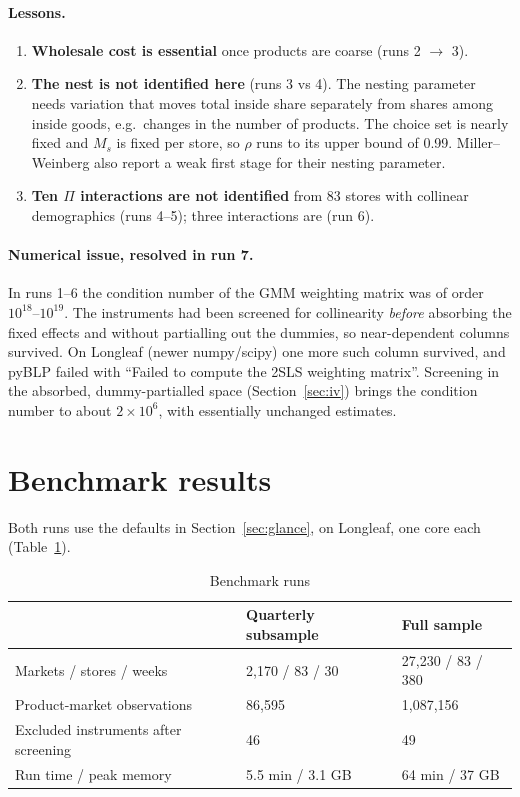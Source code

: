 \documentclass[11pt]{article}
\begin{document}
\paragraph{Lessons.}
\begin{enumerate}
  \item \textbf{Wholesale cost is essential} once products are coarse (runs 2 $\to$ 3).
  \item \textbf{The nest is not identified here} (runs 3 vs 4). The nesting parameter needs
        variation that moves total inside share separately from shares among inside goods,
        e.g.\ changes in the number of products. The choice set is nearly fixed and $M_s$ is
        fixed per store, so $\rho$ runs to its upper bound of 0.99. Miller--Weinberg also
        report a weak first stage for their nesting parameter.
  \item \textbf{Ten $\Pi$ interactions are not identified} from 83 stores with collinear
        demographics (runs 4--5); three interactions are (run 6).
\end{enumerate}

\paragraph{Numerical issue, resolved in run 7.} In runs 1--6 the condition number of the GMM
weighting matrix was of order $10^{18}$--$10^{19}$. The instruments had been screened for
collinearity \emph{before} absorbing the fixed effects and without partialling out the dummies,
so near-dependent columns survived. On Longleaf (newer numpy/scipy) one more such column
survived, and pyBLP failed with ``Failed to compute the 2SLS weighting matrix''. Screening in
the absorbed, dummy-partialled space (Section~\ref{sec:iv}) brings the condition number to
about $2\times10^6$, with essentially unchanged estimates.

\section{Benchmark results}\label{sec:results}

Both runs use the defaults in Section~\ref{sec:glance}, on Longleaf, one core each
(Table~\ref{tab:runs}).

\begin{table}[htbp]
\centering
\small
\caption{Benchmark runs}\label{tab:runs}
\begin{tabular}{@{}lll@{}}
\toprule
 & Quarterly subsample & Full sample \\
\midrule
Markets / stores / weeks & 2,170 / 83 / 30 & 27,230 / 83 / 380 \\
Product-market observations & 86,595 & 1,087,156 \\
Excluded instruments after screening & 46 & 49 \\
Run time / peak memory & 5.5 min / 3.1 GB & 64 min / 37 GB \\
\bottomrule
\end{tabular}
\end{table}
\end{document}
